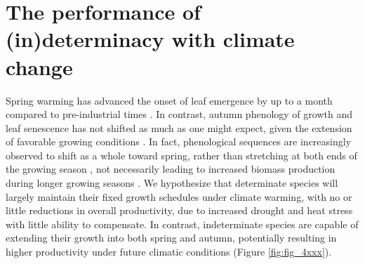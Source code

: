\documentclass{article}
\begin{document}
	
\section*{The performance of (in)determinacy with climate change} 

Spring warming has advanced the onset of leaf emergence by up to a month compared to pre-industrial times \citep{vitasseGreatAccelerationPlant2022b}. In contrast, autumn phenology of growth and leaf senescence has not shifted as much as one might expect, given the extension of favorable growing conditions  \citep{zaniIncreasedGrowingseasonProductivity2020b, zohnerEffectClimateWarming2023}. In fact, phenological sequences are increasingly observed to shift as a whole toward spring, rather than stretching at both ends of the growing season \citep{keenanTimingAutumnSenescence2015b, mengConsistentTimeAllocation2024}, not necessarily leading to increased biomass production during longer growing seasons \citep{zaniIncreasedGrowingseasonProductivity2020b}. We hypothesize that determinate species will largely maintain their fixed growth schedules under climate warming, with no or little reductions in overall productivity, due to increased drought and heat stress with little ability to compensate. In contrast, indeterminate species are capable of extending their growth into both spring and autumn, potentially resulting in higher productivity under future climatic conditions (Figure \ref{fig:fig_4xxx}). \\
\end{document}
